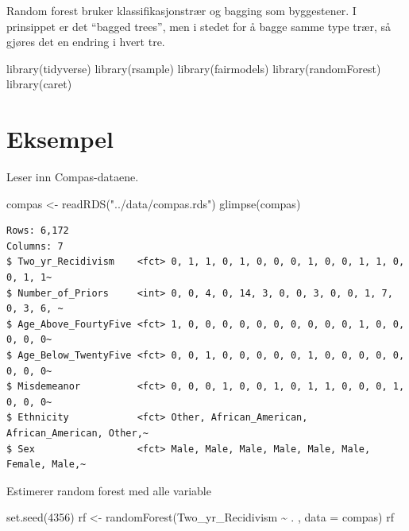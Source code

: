 \documentclass[
  letterpaper,
  DIV=11,
  numbers=noendperiod]{scrreprt}
\newenvironment{Shaded}{\begin{snugshade}}{\end{snugshade}}
\newcommand{\AttributeTok}[1]{\textcolor[rgb]{0.40,0.45,0.13}{#1}}
\newcommand{\DecValTok}[1]{\textcolor[rgb]{0.68,0.00,0.00}{#1}}
\newcommand{\FunctionTok}[1]{\textcolor[rgb]{0.28,0.35,0.67}{#1}}
\newcommand{\NormalTok}[1]{\textcolor[rgb]{0.00,0.23,0.31}{#1}}
\newcommand{\OtherTok}[1]{\textcolor[rgb]{0.00,0.23,0.31}{#1}}
\newcommand{\SpecialCharTok}[1]{\textcolor[rgb]{0.37,0.37,0.37}{#1}}
\newcommand{\StringTok}[1]{\textcolor[rgb]{0.13,0.47,0.30}{#1}}
\theoremstyle{definition}
\theoremstyle{remark}
\begin{document}
Random forest bruker klassifikasjonstrær og bagging som byggestener. I
prinsippet er det ``bagged trees'', men i stedet for å bagge samme type
trær, så gjøres det en endring i hvert tre.

\begin{Shaded}
\begin{Highlighting}[]
\FunctionTok{library}\NormalTok{(tidyverse)}
\FunctionTok{library}\NormalTok{(rsample)}
\FunctionTok{library}\NormalTok{(fairmodels)}
\FunctionTok{library}\NormalTok{(randomForest)}
\FunctionTok{library}\NormalTok{(caret)}
\end{Highlighting}
\end{Shaded}

\hypertarget{eksempel}{%
\section{Eksempel}\label{eksempel}}

Leser inn Compas-dataene.

\begin{Shaded}
\begin{Highlighting}[]
\NormalTok{compas }\OtherTok{\textless{}{-}} \FunctionTok{readRDS}\NormalTok{(}\StringTok{"../data/compas.rds"}\NormalTok{)}
\FunctionTok{glimpse}\NormalTok{(compas)}
\end{Highlighting}
\end{Shaded}

\begin{verbatim}
Rows: 6,172
Columns: 7
$ Two_yr_Recidivism    <fct> 0, 1, 1, 0, 1, 0, 0, 0, 1, 0, 0, 1, 1, 0, 0, 1, 1~
$ Number_of_Priors     <int> 0, 0, 4, 0, 14, 3, 0, 0, 3, 0, 0, 1, 7, 0, 3, 6, ~
$ Age_Above_FourtyFive <fct> 1, 0, 0, 0, 0, 0, 0, 0, 0, 0, 0, 1, 0, 0, 0, 0, 0~
$ Age_Below_TwentyFive <fct> 0, 0, 1, 0, 0, 0, 0, 0, 1, 0, 0, 0, 0, 0, 0, 0, 0~
$ Misdemeanor          <fct> 0, 0, 0, 1, 0, 0, 1, 0, 1, 1, 0, 0, 0, 1, 0, 0, 0~
$ Ethnicity            <fct> Other, African_American, African_American, Other,~
$ Sex                  <fct> Male, Male, Male, Male, Male, Male, Female, Male,~
\end{verbatim}

Estimerer random forest med alle variable

\begin{Shaded}
\begin{Highlighting}[]
\FunctionTok{set.seed}\NormalTok{(}\DecValTok{4356}\NormalTok{)}
\NormalTok{rf }\OtherTok{\textless{}{-}} \FunctionTok{randomForest}\NormalTok{(Two\_yr\_Recidivism }\SpecialCharTok{\textasciitilde{}}\NormalTok{ . , }
                    \AttributeTok{data =}\NormalTok{ compas)}
\NormalTok{rf}
\end{Highlighting}
\end{Shaded}
\end{document}
